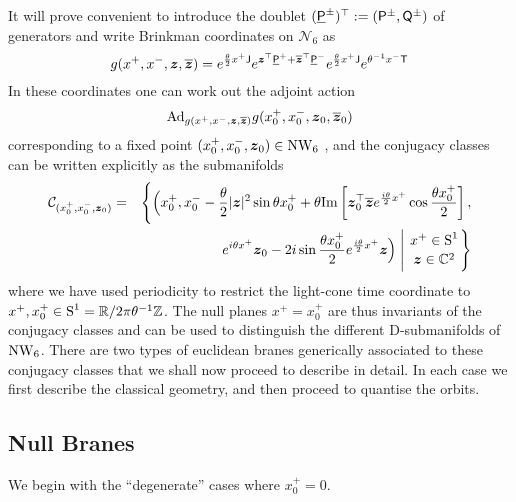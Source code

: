 It will prove convenient to introduce the doublet $(\underline{{\sf P}}^\pm)^\top :=
({\sf P}^\pm,{\sf Q} ^\pm)$ of generators and write Brinkman coordinates on
$\mathcal{N}_6$ as
\begin{equation}
  \label{NW6globalcoords}
  g(x^+,x^-,{{\boldsymbol {z} }},\overline{{{\boldsymbol {z} }}})=e^{\frac\theta2x^+{\sf J}}
  e^{{{\boldsymbol {z} }}^\top\underline{{\sf P}}^++\overline{{{\boldsymbol {z} }}}^\top\underline{{\sf P}}^-}
  e^{\frac\theta2x^+{\sf J}}
  e^{\theta^{-1}x^-{\sf T}}
\end{equation}
In these coordinates one can work out the adjoint action
\begin{equation*}
  {\rm Ad}_{g(x^+,x^-,{{\boldsymbol {z} }},\overline{{{\boldsymbol {z} }}})}g(x^+_0,x^-_0,{{\boldsymbol {z} }}_0, \overline{{{\boldsymbol {z} }}}_0)
\end{equation*}
corresponding to a fixed point $(x_0^+,x_0^-,{{\boldsymbol {z} }}_0)\in\operatorname{NW}_6$ \cite{FS1,SF1}, and
the conjugacy classes can be written explicitly as the submanifolds
\begin{eqnarray}
  \nn
  \mathcal{C}_{(x_0^+,x^-_0,\mz_0)}&=&
  \Biggl\{\Bigl(x^+_0,
  x^-_0-\frac\theta2 |\mz|^2\sin\theta x^+_0+\theta{\rm Im}\left[
    \mz_0^\top \overline{\mz} e^{\frac{i\theta}2x^+}
    \cos\frac{\theta x_0^+}2\right],\\
  &&\qquad e^{ i\theta x^+}\mz_0-2 i
  \sin\frac{\theta x_0^+}2e^{\frac{ i\theta}2x^+}\mz
  \Bigr)\Biggm| \genfrac{}{}{0pt}{}{x^+\in\S^1}{\mz\in\C^2}\Biggr\}
  \label{conjclassgen}
\end{eqnarray}
where we have used periodicity to restrict the light-cone time coordinate to
$x^+,x^+_0\in\operatorname{S}^1={\mathbb R}/2\pi\theta^{-1}{\mathbb Z}$. The null planes $x^+=x_0^+$
are thus invariants of the conjugacy classes and can be used to distinguish the
different D-submanifolds of $\operatorname{NW}_6$. There are two types of euclidean branes
generically associated to these conjugacy classes that we shall now proceed to
describe in detail. In each case we first describe the classical geometry, and
then proceed to quantise the orbits.

\subsection{Null Branes}
\label{Null}
We begin with the ``degenerate'' cases where $x_0^+=0$.

